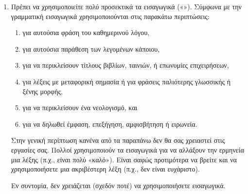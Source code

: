 \begin{enumerate}
\item
Πρέπει να χρησιμοποιείτε πολύ προσεκτικά τα εισαγωγικά («»). Σύμφωνα με την γραμματική εισαγωγικά χρησιμοποιούνται στις παρακάτω περιπτώσεις: 
\begin{enumerate}
\item
για αυτούσια φράση του καθημερινού λόγου,
\item
για αυτούσια παράθεση των λεγομένων κάποιου,
\item
για να περικλείσουν τίτλους βιβλίων, ταινιών, ή επωνυμίες επιχειρήσεων,
\item
για λέξεις με μεταφορική σημασία ή για φράσεις παλιότερης γλωσσικής ή ξένης μορφής,
\item
για να περικλείσουν ένα νεολογισμό, και
\item
για να δηλωθεί έμφαση, επεξήγηση, αμφισβήτηση ή ειρωνεία.
\end{enumerate}
Στην γενική περίπτωση κανένα από τα παραπάνω δεν θα σας χρειαστεί στις εργασίες σας. Πολλοί χρησιμοποιούν τα εισαγωγικά για να αλλάξουν την ερμηνεία μια λέξης (π.χ., είναι πολύ «καλό»). Είναι σαφώς προτιμότερα να βρείτε και να χρησιμοποιήσετε μια ακριβέστερη λέξη (π.χ., δεν είναι ευχάριστο). 

Εν συντομία, δεν χρειάζεται (σχεδόν ποτέ) να χρησιμοποιήσετε εισαγωγικά.

%



\end{enumerate}
